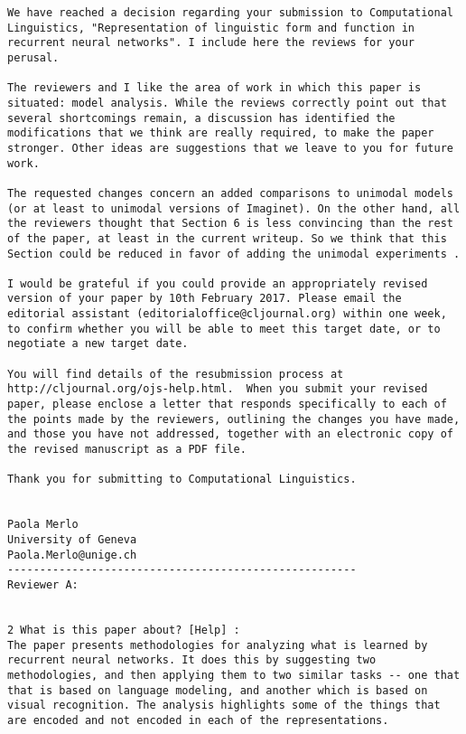 
\newpage

\begin{verbatim}
We have reached a decision regarding your submission to Computational
Linguistics, "Representation of linguistic form and function in
recurrent neural networks". I include here the reviews for your
perusal.

The reviewers and I like the area of work in which this paper is
situated: model analysis. While the reviews correctly point out that
several shortcomings remain, a discussion has identified the
modifications that we think are really required, to make the paper
stronger. Other ideas are suggestions that we leave to you for future
work.

The requested changes concern an added comparisons to unimodal models
(or at least to unimodal versions of Imaginet). On the other hand, all
the reviewers thought that Section 6 is less convincing than the rest
of the paper, at least in the current writeup. So we think that this
Section could be reduced in favor of adding the unimodal experiments .

I would be grateful if you could provide an appropriately revised
version of your paper by 10th February 2017. Please email the
editorial assistant (editorialoffice@cljournal.org) within one week,
to confirm whether you will be able to meet this target date, or to
negotiate a new target date.

You will find details of the resubmission process at
http://cljournal.org/ojs-help.html.  When you submit your revised
paper, please enclose a letter that responds specifically to each of
the points made by the reviewers, outlining the changes you have made,
and those you have not addressed, together with an electronic copy of
the revised manuscript as a PDF file.

Thank you for submitting to Computational Linguistics.


Paola Merlo
University of Geneva
Paola.Merlo@unige.ch
------------------------------------------------------
Reviewer A:


2 What is this paper about? [Help] :
The paper presents methodologies for analyzing what is learned by
recurrent neural networks. It does this by suggesting two
methodologies, and then applying them to two similar tasks -- one that
that is based on language modeling, and another which is based on
visual recognition. The analysis highlights some of the things that
are encoded and not encoded in each of the representations.



\end{verbatim}
